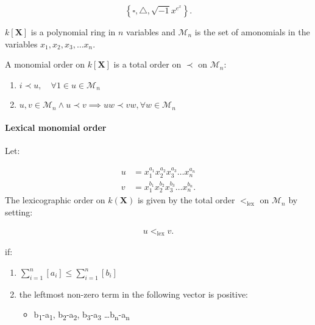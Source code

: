 \documentclass[a4paper,11pt,twoside]{article}
\begin{document}
$$\left\{\square, \triangle, \sqrt{-1} x^{e^x} \right\} 
.$$

\(k\left[ \mathbf{X} \right]\) is a polynomial ring in \(n\) variables and
\(\mathcal{M}_n\) is the set of amonomials in the variables
\(x_1, x_2, x_3, \ldots x_n\).

A monomial order on \(k\left[ \mathbf{X} \right]\) is a total order on
\(\prec\) on \(\mathcal{M}_n\):

\begin{enumerate}
\item \(i \prec u, \quad \forall 1\in u\in \mathcal{M}_n\)

\item \(u, v\in \mathcal{M}_n \land u \prec v \implies uw \prec vw, \forall w \in \mathcal{M}_n\)
\end{enumerate}

\paragraph{Lexical monomial order}
\label{sec:org3f29a1e}
Let:

$$\begin{aligned}
     u &= x_1^{a_1} x_2^{a_2} x_3^{a_3} \ldots x_n^{a_n} \\
     v &= x_1^{b_1} x_2^{b_2} x_3^{b_3} \ldots x_n^{b_n}
 .\end{aligned}$$ The lexicographic order on \(k\left( \mathbf{X} \right)\)
is given by the total order \(<_{\mathrm{lex}}\) on \(\mathcal{M}_n\) by
setting:

$$\begin{aligned}
     u <_{\mathrm{lex}} v
 .\end{aligned}$$

if:

\begin{enumerate}
\item \(\sum^{n}_{i=1}\left[ a_i  \right] \leq \sum^{n}_{i=1}\left[ b_i  \right]\)

\item the leftmost non-zero term in the following vector is positive:

\begin{itemize}
\item b\textsubscript{1}-a\textsubscript{1}, b\textsubscript{2}-a\textsubscript{2}, b\textsubscript{3}-a\textsubscript{3} \ldots{}b\textsubscript{n}-a\textsubscript{n}
\end{itemize}
\end{enumerate}
\end{document}
